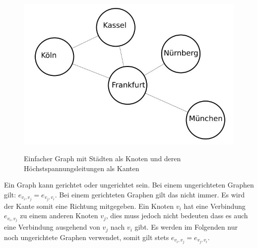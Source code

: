 \begin{figure}[t]
	\centering
	{\includegraphics[scale=0.5]{bilder/einfachergraph}\label{fig_einfachergraph}
	}\\
	\caption[Einfacher Graph mit Städten als Knoten und deren Höchstspannungsleitungen als Kanten]{Einfacher Graph mit Städten als Knoten und deren Höchstspannungsleitungen als Kanten}
	\label{fig_einfachergraph}
\end{figure}

Ein Graph kann gerichtet oder ungerichtet sein. Bei einem ungerichteten Graphen gilt: $e_{v_{i},v_{j}} = e_{v_{j},v_{i}}$. Bei einem gerichteten Graphen gilt das nicht immer. Es wird der Kante somit eine Richtung mitgegeben. Ein Knoten $v_{i}$ hat eine Verbindung $e_{v_{i},v_{j}}$ zu einem anderen Knoten $v_{j}$, dies muss jedoch nicht bedeuten dass es auch eine Verbindung ausgehend von $v_{j}$ nach $v_{i}$ gibt. Es werden im Folgenden nur noch ungerichtete Graphen verwendet, somit gilt stets  $e_{v_{i},v_{j}} = e_{v_{j},v_{i}}$.



